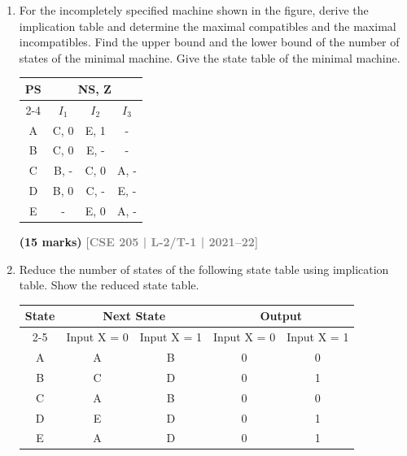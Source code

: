 \documentclass[12pt,a4paper]{article}
\newcommand{\yr}[1]{\hfill\textcolor{gray}{\small\textbf{[#1]}}}
\newcommand{\mk}[1]{\textcolor{orange!70!black}{\small\textbf{(#1 marks)}}}
\begin{document}
\begin{enumerate}
\mk{25} \yr{CSE 205 | L-2/T-1 | 2019--20}

\item For the incompletely specified machine shown in the figure, derive the implication table and determine the maximal compatibles and the maximal incompatibles. Find the upper bound and the lower bound of the number of states of the minimal machine. Give the state table of the minimal machine.

\begin{center}
  \begin{tabular}{|c|c|c|c|}
\hline
\multirow{2}{*}{PS} & \multicolumn{3}{c|}{NS, Z} \\ \cline{2-4} 
                    & $I_1$   & $I_2$   & $I_3$   \\ \hline
A                   & C, 0    & E, 1    & -       \\ \hline
B                   & C, 0    & E, -    & -       \\ \hline
C                   & B, -    & C, 0    & A, -    \\ \hline
D                   & B, 0    & C, -    & E, -    \\ \hline
E                   & -       & E, 0    & A, -    \\ \hline
\end{tabular}
\end{center}

\mk{15} \yr{CSE 205 | L-2/T-1 | 2021--22}

\item Reduce the number of states of the following state table using implication table. Show the reduced state table.

\begin{center}
  \begin{tabular}{|c|c|c|c|c|}
\hline
\multirow{2}{*}{State} & \multicolumn{2}{c|}{Next State} & \multicolumn{2}{c|}{Output} \\ \cline{2-5} 
                       & Input X = 0    & Input X = 1    & Input X = 0  & Input X = 1  \\ \hline
A                      & A              & B              & 0            & 0            \\ \hline
B                      & C              & D              & 0            & 1            \\ \hline
C                      & A              & B              & 0            & 0            \\ \hline
D                      & E              & D              & 0            & 1            \\ \hline
E                      & A              & D              & 0            & 1            \\ \hline
\end{tabular}
\end{center}


\end{enumerate}
\end{document}
